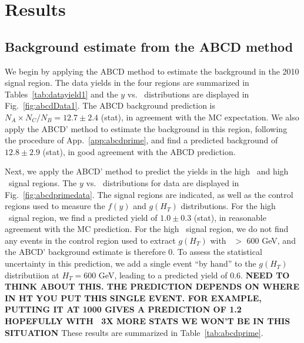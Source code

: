 \section{Results}
\label{sec:results}

\subsection{Background estimate from the ABCD method}
\label{sec:abcdres}

We begin by applying the ABCD method to estimate the background in the 2010 signal region.
The data yields in the four regions are summarized in Tables~\ref{tab:datayield1} and
the $y$ vs. \Ht\ distributions are displayed in Fig.~\ref{fig:abcdData1}.
The ABCD background prediction is $N_A \times N_C / N_B = 12.7 \pm 2.4$ (stat), in
agreement with the MC expectation. We also apply the ABCD' method to estimate the
background in this region, following the procedure of App.~\ref{app:abcdprime},
and find a predicted background of $12.8 \pm 2.9$ (stat), in good agreement
with the ABCD prediction.

Next, we apply the ABCD' method to predict the yields in the high \met\ and high \Ht\
signal regions. The $y$ vs. \Ht\ distributions for data are displayed in 
Fig.~\ref{fig:abcdprimedata}. The signal regions are indicated, as well as the control 
regions used to measure the $f(y)$ and $g(H_T)$ distributions. For the high \met\
signal region, we find a predicted yield of $1.0 \pm 0.3$ (stat), in reasonable
agreement with the MC prediction. For the high \Ht\ signal region, we do not find
any events in the control region used to extract $g(H_T)$ with \Ht\ $>$ 600 GeV,
and the ABCD' background estimate is therefore 0. To assess the statistical uncertainty
in this prediction, we add a single event ``by hand'' to the $g(H_T)$ distributiion
at $H_T = 600$ GeV, leading to a predicted yield of 0.6. 
{\bf NEED TO THINK ABOUT THIS. THE PREDICTION DEPENDS ON WHERE IN HT YOU PUT THIS }
{\bf SINGLE EVENT. FOR EXAMPLE, PUTTING IT AT 1000 GIVES A PREDICTION OF 1.2      }
{\bf HOPEFULLY WITH ~3X MORE STATS WE WON'T BE IN THIS SITUATION                  }
These results are summarized in Table~\ref{tab:abcdprime}.

